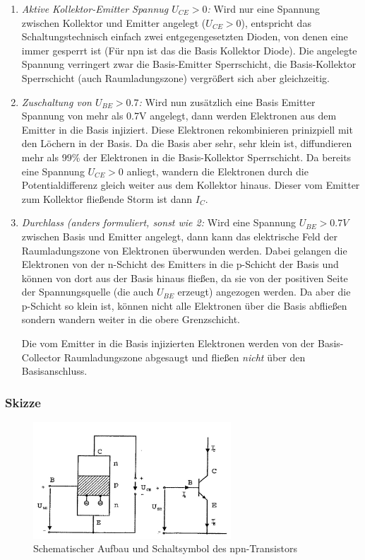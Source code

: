    \begin{enumerate}
    \item \emph{Aktive Kollektor-Emitter Spannug $U_{CE} > 0$:} Wird nur eine Spannung zwischen Kollektor und Emitter angelegt ($U_{CE} > 0$), entspricht das Schaltungstechnisch einfach zwei entgegengesetzten Dioden, von denen eine immer gesperrt ist (Für npn ist das die Basis Kollektor Diode). 
    Die angelegte Spannung verringert zwar die Basis-Emitter Sperrschicht, die Basis-Kollektor Sperrschicht (auch Raumladungszone) vergrößert sich aber gleichzeitig.  
    
    \item \emph{Zuschaltung von $U_{BE} > 0.7$:} Wird nun zusätzlich eine Basis Emitter Spannung von mehr als 0.7V angelegt, dann werden Elektronen aus dem Emitter in die Basis injiziert. Diese Elektronen rekombinieren prinizpiell mit den Löchern in der Basis. Da die Basis aber sehr, sehr klein ist, diffundieren mehr als 99\% der Elektronen in die Basis-Kollektor Sperrschicht. Da bereits eine Spannung $U_{CE} > 0$ anliegt, wandern die Elektronen durch die Potentialdifferenz gleich weiter aus dem Kollektor hinaus. Dieser vom Emitter zum Kollektor fließende Storm ist dann $I_C$.
    
    
    \item \emph{Durchlass (anders formuliert, sonst wie 2:} Wird eine Spannung $U_{BE} > 0.7V$ zwischen Basis und Emitter angelegt, dann kann das elektrische Feld der Raumladungszone von Elektronen überwunden werden.
    Dabei gelangen die Elektronen von der n-Schicht des Emitters in die p-Schicht der Basis und können von dort aus der Basis hinaus fließen, da sie von der positiven Seite der Spannungsquelle (die auch $U_{BE}$ erzeugt) angezogen werden.
    Da aber die p-Schicht so klein ist, können nicht alle Elektronen über die Basis abfließen sondern wandern weiter in die obere Grenzschicht.
    
    Die vom Emitter in die Basis injizierten Elektronen werden von der Basis-Collector Raumladungszone abgesaugt und fließen \textit{nicht} über den Basisanschluss. 
   \end{enumerate} 
    
    
    \subsubsection{Skizze}
    
    \begin{figure}
        \centering
        \includegraphics[width=0.66\textwidth]{fig/npn-transistor.jpg}
        \caption{Schematischer Aufbau und Schaltsymbol des npn-Transistors}
        \label{fig:npnTransistor}
    \end{figure}
    

